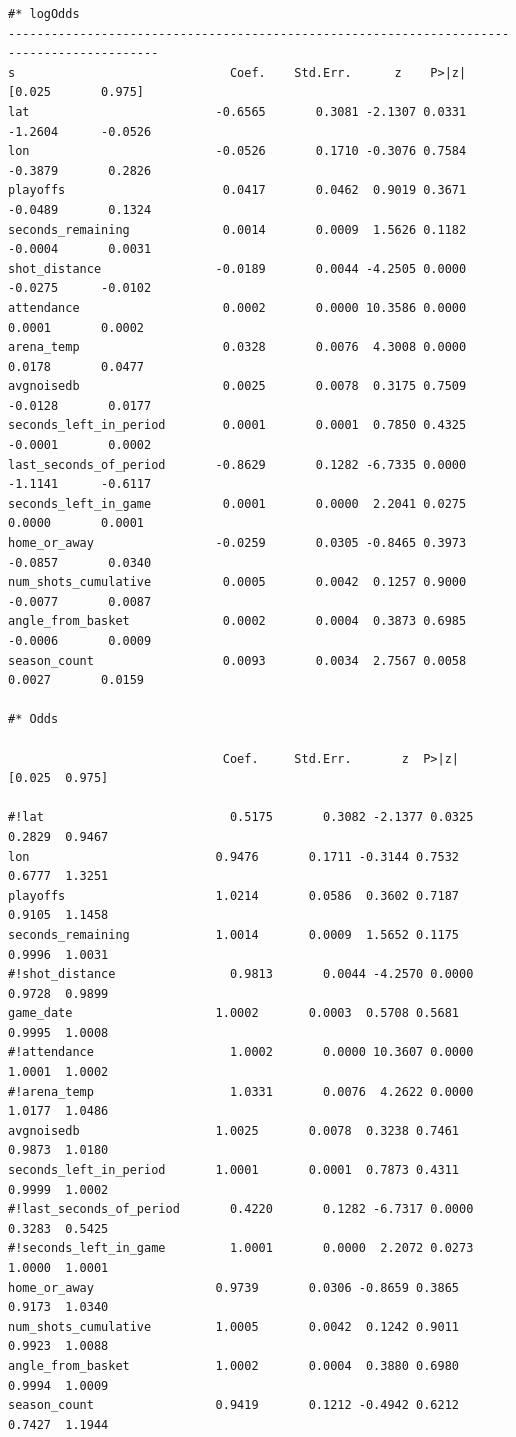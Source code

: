 \begin{verbatim}
#* logOdds
-------------------------------------------------------------------------------------------
s                              Coef.    Std.Err.      z    P>|z|      [0.025       0.975]
lat                          -0.6565       0.3081 -2.1307 0.0331       -1.2604      -0.0526
lon                          -0.0526       0.1710 -0.3076 0.7584       -0.3879       0.2826
playoffs                      0.0417       0.0462  0.9019 0.3671       -0.0489       0.1324
seconds_remaining             0.0014       0.0009  1.5626 0.1182       -0.0004       0.0031
shot_distance                -0.0189       0.0044 -4.2505 0.0000       -0.0275      -0.0102
attendance                    0.0002       0.0000 10.3586 0.0000        0.0001       0.0002
arena_temp                    0.0328       0.0076  4.3008 0.0000        0.0178       0.0477
avgnoisedb                    0.0025       0.0078  0.3175 0.7509       -0.0128       0.0177
seconds_left_in_period        0.0001       0.0001  0.7850 0.4325       -0.0001       0.0002
last_seconds_of_period       -0.8629       0.1282 -6.7335 0.0000       -1.1141      -0.6117
seconds_left_in_game          0.0001       0.0000  2.2041 0.0275        0.0000       0.0001
home_or_away                 -0.0259       0.0305 -0.8465 0.3973       -0.0857       0.0340
num_shots_cumulative          0.0005       0.0042  0.1257 0.9000       -0.0077       0.0087
angle_from_basket             0.0002       0.0004  0.3873 0.6985       -0.0006       0.0009
season_count                  0.0093       0.0034  2.7567 0.0058        0.0027       0.0159

#* Odds

                              Coef.     Std.Err.       z  P>|z|  [0.025  0.975]

#!lat                          0.5175       0.3082 -2.1377 0.0325  0.2829  0.9467
lon                          0.9476       0.1711 -0.3144 0.7532  0.6777  1.3251
playoffs                     1.0214       0.0586  0.3602 0.7187  0.9105  1.1458
seconds_remaining            1.0014       0.0009  1.5652 0.1175  0.9996  1.0031
#!shot_distance                0.9813       0.0044 -4.2570 0.0000  0.9728  0.9899
game_date                    1.0002       0.0003  0.5708 0.5681  0.9995  1.0008
#!attendance                   1.0002       0.0000 10.3607 0.0000  1.0001  1.0002
#!arena_temp                   1.0331       0.0076  4.2622 0.0000  1.0177  1.0486
avgnoisedb                   1.0025       0.0078  0.3238 0.7461  0.9873  1.0180
seconds_left_in_period       1.0001       0.0001  0.7873 0.4311  0.9999  1.0002
#!last_seconds_of_period       0.4220       0.1282 -6.7317 0.0000  0.3283  0.5425
#!seconds_left_in_game         1.0001       0.0000  2.2072 0.0273  1.0000  1.0001
home_or_away                 0.9739       0.0306 -0.8659 0.3865  0.9173  1.0340
num_shots_cumulative         1.0005       0.0042  0.1242 0.9011  0.9923  1.0088
angle_from_basket            1.0002       0.0004  0.3880 0.6980  0.9994  1.0009
season_count                 0.9419       0.1212 -0.4942 0.6212  0.7427  1.1944


\end{verbatim}
